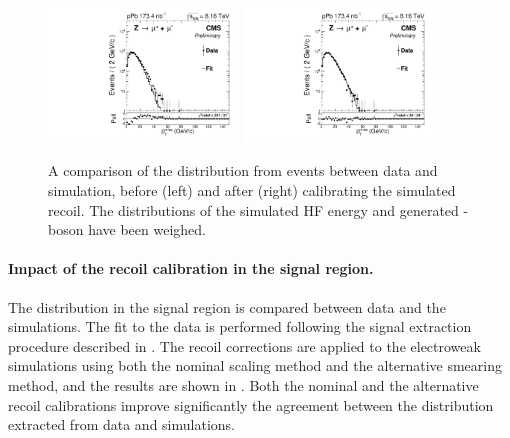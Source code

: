 \begin{figure}[htb!]
 \centering
 \includegraphics[width=0.45\textwidth]{Figures/WBoson/Analysis/Correction/Recoil/CheckFits/Z/METPF_RAW_HFBosonPTrew/PLOT_MET_DATA_ZToMuPl_PA_Model_TEMP_DY_MuEtaCM_-286_193_MuIso_0_15.pdf}
 \includegraphics[width=0.45\textwidth]{Figures/WBoson/Analysis/Correction/Recoil/CheckFits/Z/Recoil_ScalingGauss/PLOT_MET_DATA_ZToMuPl_PA_Model_TEMP_DY_MuEtaCM_-286_193_MuIso_0_15.pdf}
 \caption{A comparison of the \ptmiss distribution from \ZToMuMu events between data and simulation, before (left) and after (right) calibrating the simulated recoil. The distributions of the simulated HF energy and generated \Z-boson \pt have been weighed.}
 \label{fig:recoilClosure}
\end{figure}


\paragraph{Impact of the recoil calibration in the signal region.} The \ptmiss distribution in the signal region is compared between data and the simulations. The fit to the data is performed following the signal extraction procedure described in . The recoil corrections are applied to the electroweak simulations using both the nominal scaling method and the alternative smearing method, and the results are shown in . Both the nominal and the alternative recoil calibrations improve significantly the agreement between the \ptmiss distribution extracted from data and simulations.

